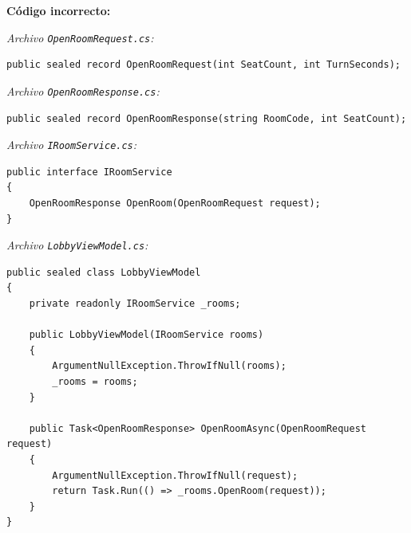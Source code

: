\textbf{Código incorrecto:}

\textit{Archivo \texttt{OpenRoomRequest.cs}:}
\begin{lstlisting}[style=csharpstyle]
public sealed record OpenRoomRequest(int SeatCount, int TurnSeconds);
\end{lstlisting}

\textit{Archivo \texttt{OpenRoomResponse.cs}:}
\begin{lstlisting}[style=csharpstyle]
public sealed record OpenRoomResponse(string RoomCode, int SeatCount);
\end{lstlisting}

\textit{Archivo \texttt{IRoomService.cs}:}
\begin{lstlisting}[style=csharpstyle]
public interface IRoomService
{
    OpenRoomResponse OpenRoom(OpenRoomRequest request);
}
\end{lstlisting}

\textit{Archivo \texttt{LobbyViewModel.cs}:}
\begin{lstlisting}[style=csharpstyle]
public sealed class LobbyViewModel
{
    private readonly IRoomService _rooms;

    public LobbyViewModel(IRoomService rooms)
    {
        ArgumentNullException.ThrowIfNull(rooms);
        _rooms = rooms;
    }

    public Task<OpenRoomResponse> OpenRoomAsync(OpenRoomRequest request)
    {
        ArgumentNullException.ThrowIfNull(request);
        return Task.Run(() => _rooms.OpenRoom(request));
    }
}
\end{lstlisting}
